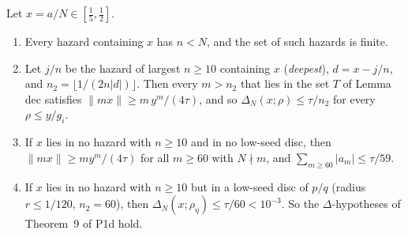 \documentclass[11pt]{article}
\theoremstyle{definition}\newtheorem{definition}[theorem]{Definition}
\theoremstyle{remark}\newtheorem{remark}[theorem]{Remark}
\begin{document}
\begin{lemma}\label{lem:H}
Let $x=a/N\in[\frac15,\frac12]$.
\begin{enumerate}
\item[(1)] Every hazard containing $x$ has $n<N$, and the set of such hazards is finite.
\item[(2)] Let $j/n$ be the hazard of largest $n\ge10$ containing $x$ (\emph{deepest}), $d=x-j/n$, and $n_2=\lfloor1/(2n|d|)\rfloor$. Then every $m>n_2$ that lies in the set $T$ of Lemma dec satisfies $\|mx\|\ge m\,y^m/(4\tau)$, and so $\Delta_N(x;\rho)\le\tau/n_2$ for every $\rho\le y/g_i$.
\item[(3)] If $x$ lies in no hazard with $n\ge10$ and in no low-seed disc, then $\|mx\|\ge my^m/(4\tau)$ for all $m\ge60$ with $N\nmid m$, and $\sum_{m\ge60}|a_m|\le\tau/59$.
\item[(4)] If $x$ lies in no hazard with $n\ge10$ but in a low-seed disc of $p/q$ (radius $r\le1/120$, $n_2=60$), then $\Delta_N(x;\rho_\eta)\le\tau/60<10^{-3}$. So the $\Delta$-hypotheses of Theorem~9 of P1d hold.
\end{enumerate}
\end{lemma}
\end{document}
